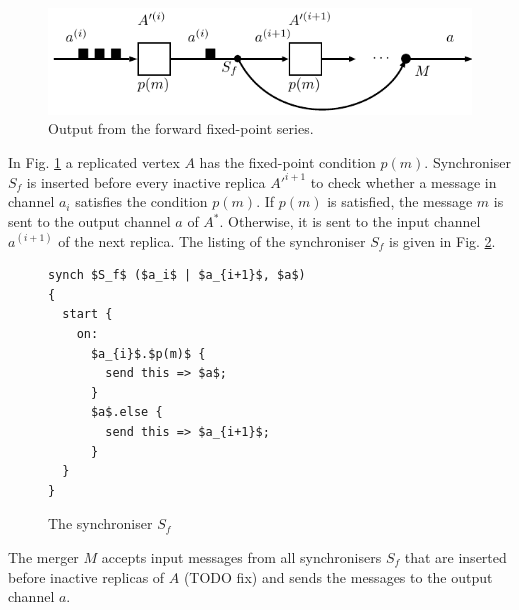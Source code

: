   \begin{figure}[h!]
  \centering
  \includegraphics{figs/chapter_04_ffp_out.pdf}
  \caption{Output from the forward fixed-point series.}
  \label{fig:ffp_out}
  \end{figure}

In Fig. \ref{fig:ffp_out} a replicated vertex $A$ has the fixed-point condition $p(m)$. Synchroniser $S_f$ is inserted before every inactive replica $A'^{i+1}$ to check whether a message in channel $a_{i}$ satisfies the condition $p(m)$. If $p(m)$ is satisfied, the message $m$ is sent to the output channel $a$ of $A^{*}$. Otherwise, it is sent to the input channel $a^{(i+1)}$ of the next replica. The listing of the synchroniser $S_f$ is given in Fig. \ref{ffp:synch_filt}.

\begin{figure}[h!]
\begin{lstlisting}[frame=single,mathescape]
synch $S_f$ ($a_i$ | $a_{i+1}$, $a$)
{
  start {
    on:
      $a_{i}$.$p(m)$ {
        send this => $a$;
      }
      $a$.else {
        send this => $a_{i+1}$;
      }
  }
}
\end{lstlisting}
\caption{The synchroniser $S_f$}
\label{ffp:synch_filt}
\end{figure}

The merger $M$ accepts input messages from all synchronisers $S_f$ that are inserted before inactive replicas of $A$ (TODO fix) and sends the messages to the output channel $a$.





